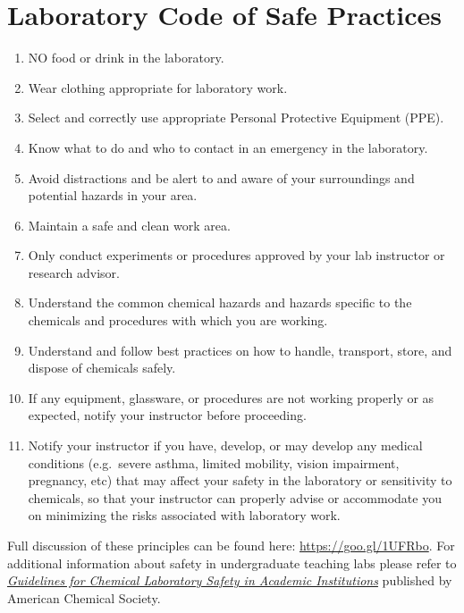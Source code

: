 \hypertarget{laboratory-code-of-safe-practices}{%
\section{Laboratory Code of Safe
Practices}\label{laboratory-code-of-safe-practices}}

\begin{enumerate}
\def\labelenumi{\arabic{enumi}.}
\tightlist
\item
  NO food or drink in the laboratory.
\item
  Wear clothing appropriate for laboratory work.
\item
  Select and correctly use appropriate Personal Protective Equipment
  (PPE).
\item
  Know what to do and who to contact in an emergency in the laboratory.
\item
  Avoid distractions and be alert to and aware of your surroundings and
  potential hazards in your area.
\item
  Maintain a safe and clean work area.
\item
  Only conduct experiments or procedures approved by your lab instructor
  or research advisor.
\item
  Understand the common chemical hazards and hazards specific to the
  chemicals and procedures with which you are working.\\
\item
  Understand and follow best practices on how to handle, transport,
  store, and dispose of chemicals safely.
\item
  If any equipment, glassware, or procedures are not working properly or
  as expected, notify your instructor before proceeding.
\item
  Notify your instructor if you have, develop, or may develop any
  medical conditions (e.g.~severe asthma, limited mobility, vision
  impairment, pregnancy, etc) that may affect your safety in the
  laboratory or sensitivity to chemicals, so that your instructor can
  properly advise or accommodate you on minimizing the risks associated
  with laboratory work.
\end{enumerate}

Full discussion of these principles can be found here:
\url{https://goo.gl/1UFRbo}. For additional information about safety in
undergraduate teaching labs please refer to
\href{https://www.acs.org/content/dam/acsorg/about/governance/committees/chemicalsafety/publications/acs-safety-guidelines-academic.pdf}{\emph{Guidelines
for Chemical Laboratory Safety in Academic Institutions}} published by
American Chemical Society.

